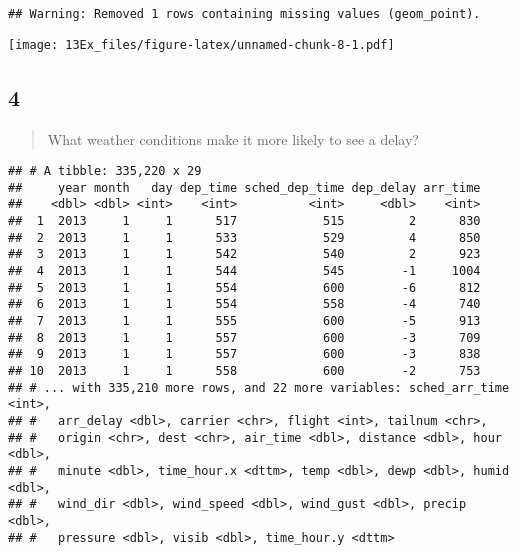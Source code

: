 \documentclass[]{ltjsarticle}
\newenvironment{Shaded}{\begin{snugshade}}{\end{snugshade}}
\newcommand{\DataTypeTok}[1]{\textcolor[rgb]{0.13,0.29,0.53}{#1}}
\newcommand{\KeywordTok}[1]{\textcolor[rgb]{0.13,0.29,0.53}{\textbf{#1}}}
\newcommand{\NormalTok}[1]{#1}
\newcommand{\OperatorTok}[1]{\textcolor[rgb]{0.81,0.36,0.00}{\textbf{#1}}}
\newcommand{\StringTok}[1]{\textcolor[rgb]{0.31,0.60,0.02}{#1}}
\begin{document}
\begin{verbatim}
## Warning: Removed 1 rows containing missing values (geom_point).
\end{verbatim}

\texttt{[image: 13Ex\_files/figure-latex/unnamed-chunk-8-1.pdf]}

\hypertarget{section-15}{%
\subsection{4}\label{section-15}}

\begin{quote}
What weather conditions make it more likely to see a delay?
\end{quote}

\begin{Shaded}
\end{Shaded}

\begin{verbatim}
## # A tibble: 335,220 x 29
##     year month   day dep_time sched_dep_time dep_delay arr_time
##    <dbl> <dbl> <int>    <int>          <int>     <dbl>    <int>
##  1  2013     1     1      517            515         2      830
##  2  2013     1     1      533            529         4      850
##  3  2013     1     1      542            540         2      923
##  4  2013     1     1      544            545        -1     1004
##  5  2013     1     1      554            600        -6      812
##  6  2013     1     1      554            558        -4      740
##  7  2013     1     1      555            600        -5      913
##  8  2013     1     1      557            600        -3      709
##  9  2013     1     1      557            600        -3      838
## 10  2013     1     1      558            600        -2      753
## # ... with 335,210 more rows, and 22 more variables: sched_arr_time <int>,
## #   arr_delay <dbl>, carrier <chr>, flight <int>, tailnum <chr>,
## #   origin <chr>, dest <chr>, air_time <dbl>, distance <dbl>, hour <dbl>,
## #   minute <dbl>, time_hour.x <dttm>, temp <dbl>, dewp <dbl>, humid <dbl>,
## #   wind_dir <dbl>, wind_speed <dbl>, wind_gust <dbl>, precip <dbl>,
## #   pressure <dbl>, visib <dbl>, time_hour.y <dttm>
\end{verbatim}
\end{document}
